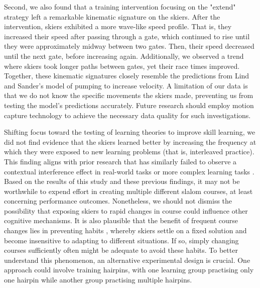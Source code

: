 Second, we also found that a training intervention focusing on the "extend" strategy left a remarkable kinematic signature on the skiers. After the intervention, skiers exhibited a more wave-like speed profile. That is, they increased their speed after passing through a gate, which continued to rise until they were approximately midway between two gates. Then, their speed decreased until the next gate, before increasing again. Additionally, we observed a trend where skiers took longer paths between gates, yet their race times improved. Together, these kinematic signatures closely resemble the predictions from Lind and Sander's model of pumping to increase velocity. A limitation of our data is that we do not know the specific movements the skiers made, preventing us from testing the model's predictions accurately. Future research should employ motion capture technology to achieve the necessary data quality for such investigations.

Shifting focus toward the testing of learning theories to improve skill learning, we did not find evidence that the skiers learned better by increasing the frequency at which they were exposed to new learning problems (that is, interleaved practice). This finding aligns with prior research that has similarly failed to observe a contextual interference effect in real-world tasks or more complex learning tasks  \parencite{brady_theoretical_1998, barreiros_contextual_2007, wulf_principles_2002}. Based on the results of this study and these previous findings, it may not be worthwhile to expend effort in creating multiple different slalom courses, at least concerning performance outcomes. Nonetheless, we should not dismiss the possibility that exposing skiers to rapid changes in course could influence other cognitive mechanisms. It is also plausible that the benefit of frequent course changes lies in preventing habits \parencite{du_relationship_2022}, whereby skiers settle on a fixed solution and become insensitive to adapting to different situations. If so, simply changing courses sufficiently often might be adequate to avoid these habits. To better understand this phenomenon, an alternative experimental design is crucial. One approach could involve training hairpins, with one learning group practising only one hairpin while another group practising multiple hairpins.

